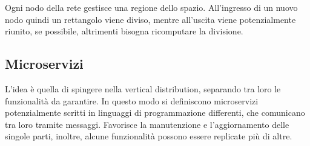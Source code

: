 Ogni nodo della rete gestisce una regione dello spazio. All'ingresso di un nuovo nodo 
quindi un rettangolo viene diviso, mentre all'uscita viene potenzialmente riunito, 
se possibile, altrimenti bisogna ricomputare la divisione.

\subsection{Microservizi}
L'idea è quella di spingere nella vertical distribution, separando 
tra loro le funzionalità da garantire. In questo modo si definiscono microservizi
potenzialmente scritti in linguaggi di programmazione differenti, che comunicano 
tra loro tramite messaggi.
Favorisce la manutenzione e l'aggiornamento delle singole parti, inoltre, 
alcune funzionalità possono essere replicate più di altre.

